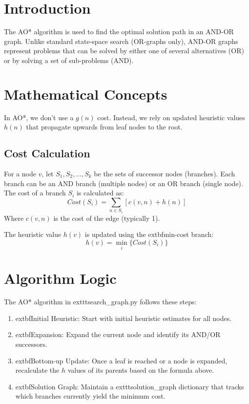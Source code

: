 \documentclass[12pt]{article}
\author{AI Lab - Assignment 3}
\date{	oday}
\begin{document}
\maketitle

\section{Introduction}
The AO* algorithm is used to find the optimal solution path in an AND-OR graph. Unlike standard state-space search (OR-graphs only), AND-OR graphs represent problems that can be solved by either one of several alternatives (OR) or by solving a set of sub-problems (AND).

\section{Mathematical Concepts}
In AO*, we don't use a $g(n)$ cost. Instead, we rely on updated heuristic values $h(n)$ that propagate upwards from leaf nodes to the root.

\subsection{Cost Calculation}
For a node $v$, let $S_1, S_2, \dots, S_k$ be the sets of successor nodes (branches). Each branch can be an AND branch (multiple nodes) or an OR branch (single node). The cost of a branch $S_i$ is calculated as:
\begin{equation}
    Cost(S_i) = \sum_{n \in S_i} [c(v, n) + h(n)]
\end{equation}
Where $c(v, n)$ is the cost of the edge (typically 1).

The heuristic value $h(v)$ is updated using the 	extbf{min-cost} branch:
\begin{equation}
    h(v) = \min_{i} \{ Cost(S_i) \}
\end{equation}

\section{Algorithm Logic}
The AO* algorithm in 	exttt{search\_graph.py} follows these steps:
\begin{enumerate}
    \item 	extbf{Initial Heuristic}: Start with initial heuristic estimates for all nodes.
    \item 	extbf{Expansion}: Expand the current node and identify its AND/OR successors.
    \item 	extbf{Bottom-up Update}: Once a leaf is reached or a node is expanded, recalculate the $h$ values of its parents based on the formula above.
    \item 	extbf{Solution Graph}: Maintain a 	exttt{solution\_graph} dictionary that tracks which branches currently yield the minimum cost.
\end{enumerate}
\end{document}
